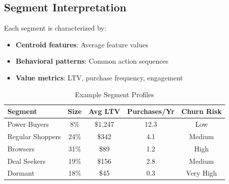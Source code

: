 \subsection{Segment Interpretation}

Each segment is characterized by:

\begin{itemize}
    \item \textbf{Centroid features}: Average feature values
    \item \textbf{Behavioral patterns}: Common action sequences
    \item \textbf{Value metrics}: LTV, purchase frequency, engagement
\end{itemize}

\begin{table}[h]
\centering
\caption{Example Segment Profiles}
\begin{tabular}{lcccc}
\toprule
\textbf{Segment} & \textbf{Size} & \textbf{Avg LTV} & \textbf{Purchases/Yr} & \textbf{Churn Risk} \\
\midrule
Power Buyers & 8\% & \$1,247 & 12.3 & Low \\
Regular Shoppers & 24\% & \$342 & 4.1 & Medium \\
Browsers & 31\% & \$89 & 1.2 & High \\
Deal Seekers & 19\% & \$156 & 2.8 & Medium \\
Dormant & 18\% & \$45 & 0.3 & Very High \\
\bottomrule
\end{tabular}
\end{table}


